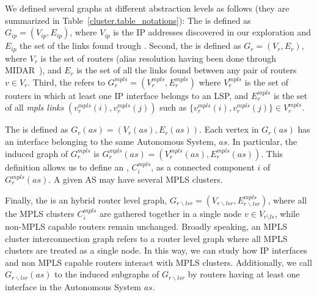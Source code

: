 We defined several graphs at different abstraction levels as follows (they are
summarized in Table~\ref{cluster.table_notations}): The  is
defined as $G_{ip}=(V_{ip}, E_{ip})$, where $V_{ip}$ is the IP addresses
discovered in our exploration and $E_{ip}$ the set of the links found trough
\traceroute.   Second, the  is defined as $G_{r}=(V_{r},
E_{r})$, where $V_{r}$ is the set of routers (alias resolution having been done
through MIDAR~\cite{Keys13}), and $E_{r}$ is the set of all the links found
between any pair of routers $v \in V_{r}$. Third, the  refers to $G^{mpls}_{r}=(V^{mpls}_{r}, E^{mpls}_{r})$ where
$V^{mpls}_{r}$ is the set of routers in which at least one IP interface belongs
to an LSP, and  $E^{mpls}_{r}$ is the set of all \textit{mpls links}
$(v^{mpls}_{r}(i), v^{mpls}_{r}(j))$ such as
$\{{v^{mpls}_{r}(i)},{v^{mpls}_{r}(j)} \}\in V^{mpls}_{r}$.

The  is defined as $G_{r}(as)=(V_{r}(as), E_{r}(as))$.
Each vertex in $G_{r}(as)$ has an interface belonging to the same Autonomous
System, $as$.  In particular, the induced graph of $G_r^{mpls}$ is
$G^{mpls}_{r}(as)=(V^{mpls}_{r}(as), E^{mpls}_{r}(as))$.  This definition allows
us to define an , $C^{mpls}_{i}$, as a connected component $i$
of $G^{mpls}_{r}(as)$. A given AS may have several MPLS clusters.

Finally, the  is an hybrid router level
graph,  $G_{r\backslash lsr}=(V_{r\backslash lsr},E^{mpls}_{r\backslash lsr})$,
where all the MPLS clusters $C^{mpls}_{i}$ are gathered together in a single
node $v\in V_{r\setminus ls}$, while non-MPLS capable routers remain unchanged.
Broadly speaking, an MPLS cluster interconnection graph refers to a router level
graph where all MPLS clusters are treated as a single node. In this way, we can
study how IP interfaces and non MPLS capable routers interact with MPLS
clusters. Additionally, we call $G_{r\backslash lsr}(as)$ to the induced
subgraphs of $G_{r\backslash lsr}$ by routers having at least one interface in
the Autonomous System $as$.


